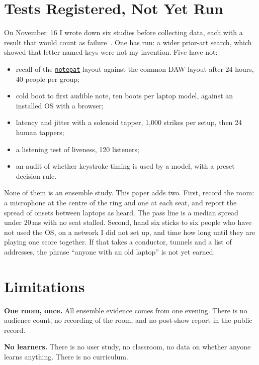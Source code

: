 \documentclass[10pt,letterpaper,twocolumn]{article}
\newcommand{\np}{\href{https://notepat.com}{\texttt{notepat}}}
\begin{document}

\section{Tests Registered, Not Yet Run}
\label{sec:tests}

On November~16 I wrote down six studies before collecting data, each with a result that would count as failure~\citep{scudder2026protocols}. One has run: a wider prior-art search, which showed that letter-named keys were not my invention. Five have not:

\begin{itemize}
  \item recall of the \np{} layout against the common DAW layout after 24 hours, 40 people per group;
  \item cold boot to first audible note, ten boots per laptop model, against an installed OS with a browser;
  \item latency and jitter with a solenoid tapper, 1,000 strikes per setup, then 24 human tappers;
  \item a listening test of liveness, 120 listeners;
  \item an audit of whether keystroke timing is used by a model, with a preset decision rule.
\end{itemize}

None of them is an ensemble study. This paper adds two. First, record the room: a microphone at the centre of the ring and one at each seat, and report the spread of onsets between laptops as heard. The pass line is a median spread under 20\,ms with no seat stalled. Second, hand six sticks to six people who have not used the OS, on a network I did not set up, and time how long until they are playing one score together. If that takes a conductor, tunnels and a list of addresses, the phrase ``anyone with an old laptop'' is not yet earned.


\section{Limitations}
\label{sec:limitations}

\textbf{One room, once.} All ensemble evidence comes from one evening. There is no audience count, no recording of the room, and no post-show report in the public record.

\textbf{No learners.} There is no user study, no classroom, no data on whether anyone learns anything. There is no curriculum.
\end{document}
